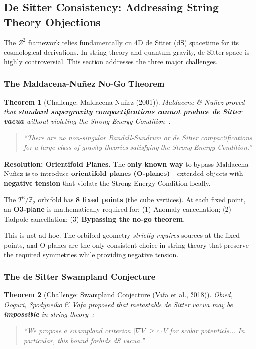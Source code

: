 \documentclass[11pt,a4paper]{article}
\theoremstyle{plain}
\newtheorem{theorem}{Theorem}[section]
\theoremstyle{definition}
\theoremstyle{remark}
\newcommand{\Tthree}{T^3}
\newcommand{\Ztwo}{\mathbb{Z}_2}
\begin{document}
\subsection{De Sitter Consistency: Addressing String Theory Objections}

The $Z^2$ framework relies fundamentally on 4D de Sitter (dS) spacetime for its cosmological derivations. In string theory and quantum gravity, de Sitter space is highly controversial. This section addresses the three major challenges.

\subsubsection{The Maldacena-Nu\~{n}ez No-Go Theorem}

\begin{theorem}[Challenge: Maldacena-Nu\~{n}ez (2001)]
Maldacena \& Nu\~{n}ez proved that \textbf{standard supergravity compactifications cannot produce de Sitter vacua} without violating the Strong Energy Condition~\cite{MN01}:
\begin{quote}
``There are no non-singular Randall-Sundrum or de Sitter compactifications for a large class of gravity theories satisfying the Strong Energy Condition.''
\end{quote}
\end{theorem}

\textbf{Resolution: Orientifold Planes.} The \textbf{only known way} to bypass Maldacena-Nu\~{n}ez is to introduce \textbf{orientifold planes (O-planes)}---extended objects with \textbf{negative tension} that violate the Strong Energy Condition locally.

The $\Tthree/\Ztwo$ orbifold has \textbf{8 fixed points} (the cube vertices). At each fixed point, an \textbf{O3-plane} is mathematically required for: (1) Anomaly cancellation; (2) Tadpole cancellation; (3) \textbf{Bypassing the no-go theorem}.

This is not ad hoc. The orbifold geometry \emph{strictly requires} sources at the fixed points, and O-planes are the only consistent choice in string theory that preserve the required symmetries while providing negative tension.

\subsubsection{The de Sitter Swampland Conjecture}

\begin{theorem}[Challenge: Swampland Conjecture (Vafa et al., 2018)]
Obied, Ooguri, Spodyneiko \& Vafa proposed that metastable de Sitter vacua may be \textbf{impossible} in string theory~\cite{OOSV18}:
\begin{quote}
``We propose a swampland criterion $|\nabla V| \geq c \cdot V$ for scalar potentials... In particular, this bound forbids dS vacua.''
\end{quote}
\end{theorem}
\end{document}
